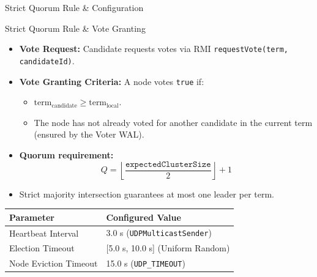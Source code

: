 \documentclass[aspectratio=169, 10pt]{beamer}
\begin{document}
\begin{frame}{Strict Quorum Rule \& Configuration}
    \begin{alertblock}{Strict Quorum Rule \& Vote Granting}
        \begin{itemize}
            \item \textbf{Vote Request:} Candidate requests votes via RMI \texttt{requestVote(term, candidateId)}.
            \item \textbf{Vote Granting Criteria:} A node votes \texttt{true} if:
            \begin{itemize}
                \item $\text{term}_{\text{candidate}} \ge \text{term}_{\text{local}}$.
                \item The node has not already voted for another candidate in the current term (ensured by the Voter WAL).
            \end{itemize}
            \item \textbf{Quorum requirement:}
            \[
                Q = \left\lfloor \frac{\texttt{expectedClusterSize}}{2} \right\rfloor + 1
            \]
            \item Strict majority intersection guarantees at most one leader per term.
        \end{itemize}
    \end{alertblock}
    
    \vspace{0.1cm}
    \centering
    \scriptsize
    \begin{tabular}{@{}ll@{}}
        \toprule
        \textbf{Parameter} & \textbf{Configured Value} \\
        \midrule
        Heartbeat Interval & 3.0 s (\texttt{UDPMulticastSender}) \\
        Election Timeout & [5.0 s, 10.0 s] (Uniform Random) \\
        Node Eviction Timeout & 15.0 s (\texttt{UDP\_TIMEOUT}) \\
        \bottomrule
    \end{tabular}
\end{frame}
\end{document}
